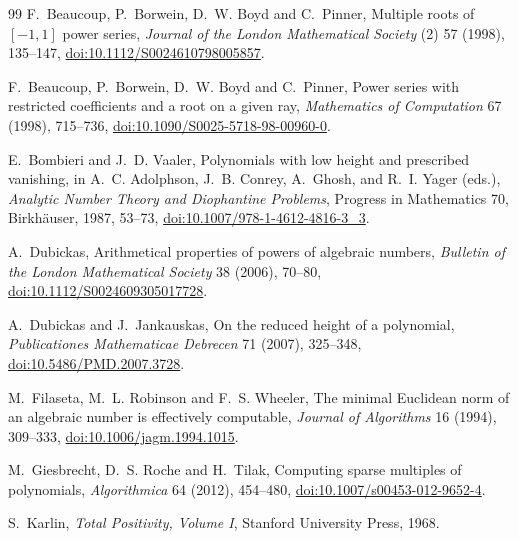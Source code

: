 \documentclass[11pt]{article}
\begin{document}
\begin{thebibliography}{99}
\small
{}
F.~Beaucoup, P.~Borwein, D.~W. Boyd and C.~Pinner,
\newblock Multiple roots of $[-1,1]$ power series,
\newblock \emph{Journal of the London Mathematical Society} (2) 57 (1998), 135--147,
\newblock \href{https://doi.org/10.1112/S0024610798005857}
{doi:10.1112/S0024610798005857}.

F.~Beaucoup, P.~Borwein, D.~W. Boyd and C.~Pinner,
\newblock Power series with restricted coefficients and a root on a given ray,
\newblock \emph{Mathematics of Computation} 67 (1998), 715--736,
\newblock \href{https://doi.org/10.1090/S0025-5718-98-00960-0}
{doi:10.1090/S0025-5718-98-00960-0}.

E.~Bombieri and J.~D. Vaaler,
\newblock Polynomials with low height and prescribed vanishing,
\newblock in A.~C. Adolphson, J.~B. Conrey, A.~Ghosh, and R.~I. Yager (eds.),
\emph{Analytic Number Theory and Diophantine Problems},
Progress in Mathematics 70, Birkh\"auser, 1987, 53--73,
\newblock \href{https://doi.org/10.1007/978-1-4612-4816-3_3}
{doi:10.1007/978-1-4612-4816-3\_3}.

A.~Dubickas,
\newblock Arithmetical properties of powers of algebraic numbers,
\newblock \emph{Bulletin of the London Mathematical Society} 38 (2006), 70--80,
\newblock \href{https://doi.org/10.1112/S0024609305017728}
{doi:10.1112/S0024609305017728}.

A.~Dubickas and J.~Jankauskas,
\newblock On the reduced height of a polynomial,
\newblock \emph{Publicationes Mathematicae Debrecen} 71 (2007), 325--348,
\newblock \href{https://doi.org/10.5486/PMD.2007.3728}
{doi:10.5486/PMD.2007.3728}.

M.~Filaseta, M.~L. Robinson and F.~S. Wheeler,
\newblock The minimal Euclidean norm of an algebraic number is effectively
computable,
\newblock \emph{Journal of Algorithms} 16 (1994), 309--333,
\newblock \href{https://doi.org/10.1006/jagm.1994.1015}
{doi:10.1006/jagm.1994.1015}.

M.~Giesbrecht, D.~S. Roche and H.~Tilak,
\newblock Computing sparse multiples of polynomials,
\newblock \emph{Algorithmica} 64 (2012), 454--480,
\newblock \href{https://doi.org/10.1007/s00453-012-9652-4}
{doi:10.1007/s00453-012-9652-4}.

S.~Karlin,
\newblock \emph{Total Positivity, Volume I},
\newblock Stanford University Press, 1968.


\end{thebibliography}
\end{document}
